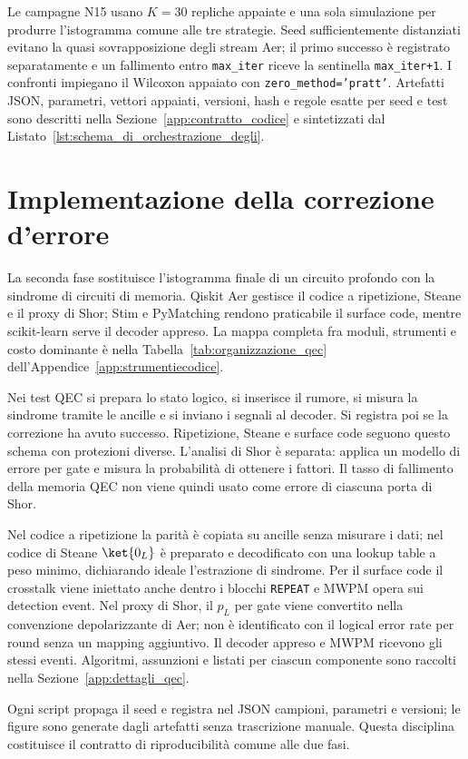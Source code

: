 \begin{onehalfspace}
Le campagne N15 usano $K=30$ repliche appaiate e una sola simulazione per produrre
l'istogramma comune alle tre strategie. Seed sufficientemente distanziati evitano la
quasi sovrapposizione degli stream Aer; il primo successo è registrato separatamente e
un fallimento entro \texttt{max\_iter} riceve la sentinella
\texttt{max\_iter+1}. I confronti impiegano il Wilcoxon appaiato con
\texttt{zero\_method='pratt'}. Artefatti JSON, parametri, vettori appaiati, versioni,
hash e regole esatte per seed e test sono descritti nella
Sezione~\ref{app:contratto_codice} e sintetizzati dal
Listato~\ref{lst:schema_di_orchestrazione_degli}.

\section{Implementazione della correzione d'errore}
\label{sec:impl_qec}

La seconda fase sostituisce l'istogramma finale di un circuito profondo con la sindrome
di circuiti di memoria. Qiskit Aer gestisce il codice a ripetizione, Steane e il proxy
di Shor; Stim e PyMatching rendono praticabile il surface code, mentre scikit-learn
serve il decoder appreso. La mappa completa fra moduli, strumenti e costo dominante è
nella Tabella~\ref{tab:organizzazione_qec} dell'Appendice~\ref{app:strumentiecodice}.

Nei test QEC si prepara lo stato logico, si inserisce il rumore, si misura la sindrome tramite le ancille e si inviano i segnali al decoder. Si registra poi se la correzione ha avuto successo. Ripetizione, Steane e surface code seguono questo schema con protezioni diverse. L'analisi di Shor è separata: applica un modello di errore per gate e misura la probabilità di ottenere i fattori. Il tasso di fallimento della memoria QEC non viene quindi usato come errore di ciascuna porta di Shor.

Nel codice a ripetizione la parità è copiata su ancille senza misurare i dati; nel codice
di Steane $\ket{0_L}$ è preparato e decodificato con una lookup table a peso minimo,
dichiarando ideale l'estrazione di sindrome. Per il surface code il crosstalk viene
iniettato anche dentro i blocchi \texttt{REPEAT} e \ac{MWPM} opera sui detection event.
Nel proxy di Shor, il $p_L$ per gate viene convertito nella convenzione depolarizzante di
Aer; non è identificato con il logical error rate per round senza un mapping aggiuntivo.
Il decoder appreso e \ac{MWPM} ricevono gli stessi eventi. Algoritmi, assunzioni e
listati per ciascun componente sono raccolti nella Sezione~\ref{app:dettagli_qec}.

Ogni script propaga il seed e registra nel JSON campioni, parametri e versioni; le figure
sono generate dagli artefatti senza trascrizione manuale. Questa disciplina costituisce
il contratto di riproducibilità comune alle due fasi.

\end{onehalfspace}
